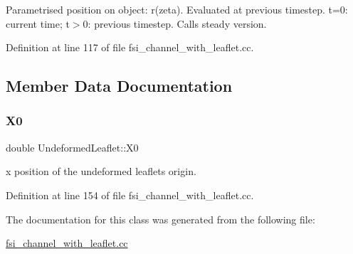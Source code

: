 Parametrised position on object\+: r(zeta). Evaluated at previous timestep. t=0\+: current time; t$>$0\+: previous timestep. Calls steady version. 



Definition at line 117 of file fsi\+\_\+channel\+\_\+with\+\_\+leaflet.\+cc.



\subsection{Member Data Documentation}
\mbox{\label{classUndeformedLeaflet_aa89fc695af9e53aa38894c9d875afd36}} 
\subsubsection{\texorpdfstring{X0}{X0}}
{\footnotesize\ttfamily double Undeformed\+Leaflet\+::\+X0\hspace{0.3cm}{\ttfamily [private]}}



x position of the undeformed leaflet\textquotesingle{}s origin. 



Definition at line 154 of file fsi\+\_\+channel\+\_\+with\+\_\+leaflet.\+cc.



The documentation for this class was generated from the following file\+:\begin{DoxyCompactItemize}
\item 
\hyperlink{fsi__channel__with__leaflet_8cc}{fsi\+\_\+channel\+\_\+with\+\_\+leaflet.\+cc}\end{DoxyCompactItemize}
